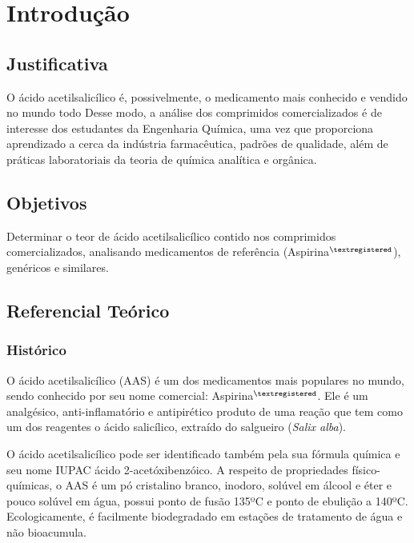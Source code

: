 \chapter{Introdução}\label{intro}
\section{Justificativa}\label{sub:just}    

O ácido acetilsalicílico é, possivelmente, o medicamento mais conhecido e vendido no mundo todo
Desse modo, a análise dos comprimidos comercializados é de interesse dos estudantes da Engenharia Química,
uma vez que proporciona aprendizado a cerca da indústria farmacêutica, padrões de qualidade, além de
práticas laboratoriais da teoria de química analítica e orgânica.

\section{Objetivos}\label{sub:Objetivos}
Determinar o teor de ácido acetilsalicílico contido nos comprimidos comercializados, analisando
medicamentos de referência (Aspirina$^{\tiny{\textregistered}}$), genéricos e similares.

\section{Referencial Teórico}\label{sub:reft}

\subsection{Histórico}\label{sub:Histórico}

O ácido acetilsalicílico (AAS) é um dos medicamentos mais populares no mundo, sendo conhecido por seu nome
comercial: Aspirina$^{\tiny{\textregistered}}$. Ele é um analgésico, anti-inflamatório e antipirético
produto de uma reação que tem como um dos reagentes o ácido salicílico, extraído do salgueiro (\textit{Salix
    alba}).  

O ácido acetilsalicílico pode ser identificado também pela sua fórmula química  e seu nome IUPAC
ácido 2-acetóxibenzóico. A respeito de propriedades físico-químicas, o AAS é um pó cristalino branco,
inodoro, solúvel em álcool e éter e pouco solúvel em água, possui ponto de fusão 135ºC e ponto de ebulição
a 140ºC. Ecologicamente, é facilmente biodegradado em estações de tratamento de água e não bioacumula.
\cite{teves}

